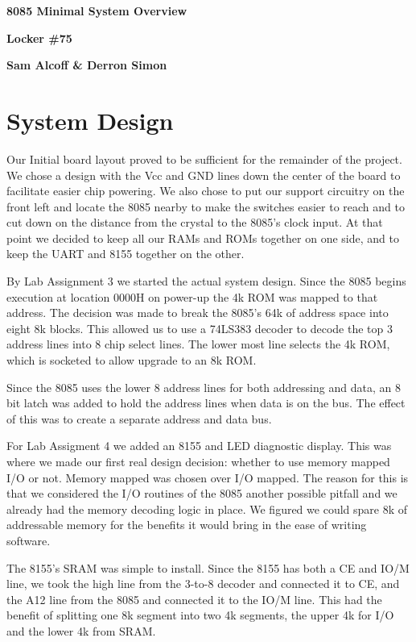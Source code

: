 %




\centerline{\LARGE \bf 8085 Minimal System Overview}
\centerline{\Large \bf Locker \#75}
\centerline{\Large \bf Sam Alcoff \& Derron Simon}


\section{System Design}

Our Initial board layout proved to be sufficient for the remainder of the project.  We
chose a design with the Vcc and GND lines down the center of the board to facilitate easier chip
powering.  We also chose to put our support circuitry on the front left and locate the 8085
nearby to make the switches easier to reach and to cut down on the distance from the crystal to
the 8085's clock input.  At that point we decided to keep all our RAMs and ROMs together on one 
side, and to keep the UART and 8155 together on the other.

By Lab Assignment 3 we started the actual system design.  Since the 8085 begins execution
at location 0000H on power-up the 4k ROM was mapped to that address.  The decision was made to break the
8085's 64k of address space into eight 8k blocks.  This allowed us to use a 74LS383 decoder to
decode the top 3 address lines into 8 chip select lines.  The lower most line selects the 4k ROM,
which is socketed to allow upgrade to an 8k ROM.

Since the 8085 uses the lower 8 address lines for both addressing and data, an
8 bit latch was added to hold the address lines when data is on the bus.  The effect of this was 
to create a separate address and data bus.

For Lab Assigment 4 we added an 8155 and LED diagnostic display.  This was where we made our 
first real design decision: whether to use memory mapped I/O or not.  Memory mapped was chosen over
I/O mapped.  The reason for this is that we considered the I/O routines of the 8085 another possible 
pitfall and we already had the memory decoding logic in place.  We figured we could spare 8k of addressable
memory for the benefits it would bring in the ease of writing software.

The 8155's SRAM was simple to install.  Since the 8155 has both a CE and IO/M line, we took
the high line from the 3-to-8 decoder and connected it to CE, and the A12 line from the 8085 and
connected it to the IO/M line.  This had the benefit of splitting one 8k segment into two 4k 
segments, the upper 4k for I/O and the lower 4k from SRAM.

